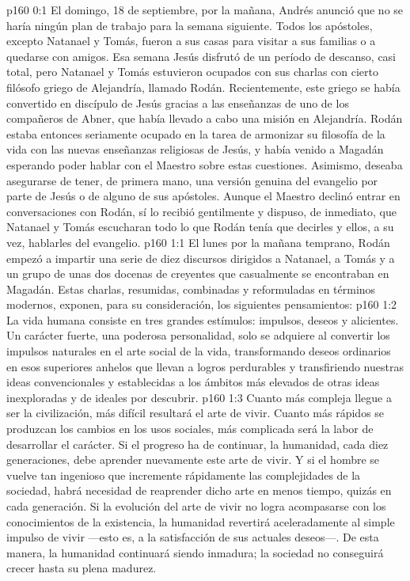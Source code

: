 \author{Comisión de seres intermedios}
\vs p160 0:1 El domingo, 18 de septiembre, por la mañana, Andrés anunció que no se haría ningún plan de trabajo para la semana siguiente. Todos los apóstoles, excepto Natanael y Tomás, fueron a sus casas para visitar a sus familias o a quedarse con amigos. Esa semana Jesús disfrutó de un período de descanso, casi total, pero Natanael y Tomás estuvieron ocupados con sus charlas con cierto filósofo griego de Alejandría, llamado Rodán. Recientemente, este griego se había convertido en discípulo de Jesús gracias a las enseñanzas de uno de los compañeros de Abner, que había llevado a cabo una misión en Alejandría. Rodán estaba entonces seriamente ocupado en la tarea de armonizar su filosofía de la vida con las nuevas enseñanzas religiosas de Jesús, y había venido a Magadán esperando poder hablar con el Maestro sobre estas cuestiones. Asimismo, deseaba asegurarse de tener, de primera mano, una versión genuina del evangelio por parte de Jesús o de alguno de sus apóstoles. Aunque el Maestro declinó entrar en conversaciones con Rodán, sí lo recibió gentilmente y dispuso, de inmediato, que Natanael y Tomás escucharan todo lo que Rodán tenía que decirles y ellos, a su vez, hablarles del evangelio.
\vs p160 1:1 El lunes por la mañana temprano, Rodán empezó a impartir una serie de diez discursos dirigidos a Natanael, a Tomás y a un grupo de unas dos docenas de creyentes que casualmente se encontraban en Magadán. Estas charlas, resumidas, combinadas y reformuladas en términos modernos, exponen, para su consideración, los siguientes pensamientos:
\vs p160 1:2 \pc La vida humana consiste en tres grandes estímulos: impulsos, deseos y alicientes. Un carácter fuerte, una poderosa personalidad, solo se adquiere al convertir los impulsos naturales en el arte social de la vida, transformando deseos ordinarios en esos superiores anhelos que llevan a logros perdurables y transfiriendo nuestras ideas convencionales y establecidas a los ámbitos más elevados de otras ideas inexploradas y de ideales por descubrir.
\vs p160 1:3 Cuanto más compleja llegue a ser la civilización, más difícil resultará el arte de vivir. Cuanto más rápidos se produzcan los cambios en los usos sociales, más complicada será la labor de desarrollar el carácter. Si el progreso ha de continuar, la humanidad, cada diez generaciones, debe aprender nuevamente este arte de vivir. Y si el hombre se vuelve tan ingenioso que incremente rápidamente las complejidades de la sociedad, habrá necesidad de reaprender dicho arte en menos tiempo, quizás en cada generación. Si la evolución del arte de vivir no logra acompasarse con los conocimientos de la existencia, la humanidad revertirá aceleradamente al simple impulso de vivir ---esto es, a la satisfacción de sus actuales deseos---. De esta manera, la humanidad continuará siendo inmadura; la sociedad no conseguirá crecer hasta su plena madurez.
